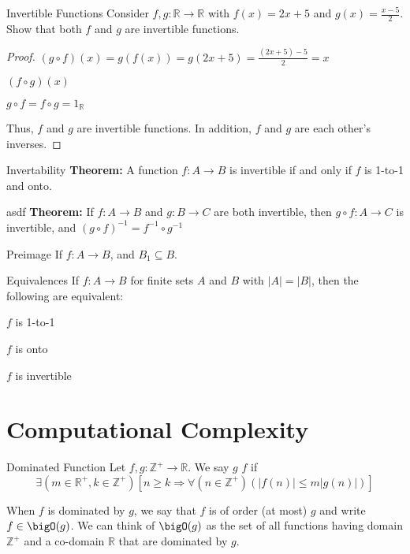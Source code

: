 \documentclass[12pt]{report}
\begin{document}
\begin{exbox}{Invertible Functions}
	Consider $f,g : \mathbb{R} \rightarrow \mathbb{R}$ with $f(x) = 2x+5$ and $g(x) = \frac{x-5}{2}$. Show that both $f$ and $g$ are invertible functions.
	\tcblower
	\begin{proof}
		$(g \circ f)(x) = g(f(x)) = g(2x+5) = \frac{(2x+5) - 5}{2} = x$

		$(f \circ g)(x)$

		$g \circ f = f \circ g = 1_{\mathbb{R}}$

		Thus, $f$ and $g$ are invertible functions. In addition, $f$ and $g$ are each other's inverses.
	\end{proof}
\end{exbox}

\begin{thmbox}{Invertability}
	\textbf{Theorem:} A function $f : A \rightarrow B$ is invertible if and only if $f$ is 1-to-1 and onto.
	\tcblower

\end{thmbox}

\begin{thmbox}{asdf}
	\textbf{Theorem:} If $f : A \rightarrow B$ and $g : B \rightarrow C$ are both invertible, then $g \circ f : A \rightarrow C$ is invertible, and $(g \circ f)^{-1} = f^{-1} \circ g^{-1}$
\end{thmbox}

\begin{dfnbox}{Preimage}
	If $f : A \rightarrow B$, and $B_1 \subseteq B$.
\end{dfnbox}

\begin{thmbox}{Equivalences}
	If $f : A \rightarrow B$ for finite sets $A$ and $B$ with $|A| = |B|$, then the following are equivalent:
	\begin{dfnitems}
		\item $f$ is 1-to-1
		\item $f$ is onto
		\item $f$ is invertible
	\end{dfnitems}
\end{thmbox}

\chapter{Computational Complexity}
\begin{dfnbox}{Dominated Function}
	Let $f,g : \mathbb{Z}^+ \rightarrow \mathbb{R}$. We say $g$  $f$ if %
	$$\exists (m \in \mathbb{R}^+, k \in \mathbb{Z}^+)\left[ n \geq k \Rightarrow \forall (n \in \mathbb{Z}^+)\left( |f(n)| \leq m|g(n)| \right) \right]$$

	When $f$ is dominated by $g$, we say that $f$ is of order (at most) $g$ and write $f \in \bigO(g)$. We can think of $\bigO(g)$ as the set of all functions having domain $\mathbb{Z}^+$ and a co-domain $\mathbb{R}$ that are dominated by $g$.
\end{dfnbox}
\end{document}
